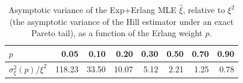\begin{table}[t]
\centering
\footnotesize
\setlength{\tabcolsep}{4pt}
\caption{Asymptotic variance of the Exp+Erlang MLE $\hat\xi$, relative to $\xi^2$ (the asymptotic variance of the Hill estimator under an exact Pareto tail), as a function of the Erlang weight $p$.}
\label{tab:infl}
\begin{tabular}{lrrrrrrr}
\toprule
$p$ & 0.05 & 0.10 & 0.20 & 0.30 & 0.50 & 0.70 & 0.90 \\
\midrule
$\sigma^2_\xi(p)/\xi^2$ & 118.23 & 33.50 & 10.07 & 5.12 & 2.21 & 1.25 & 0.78 \\
\bottomrule
\end{tabular}
\end{table}
